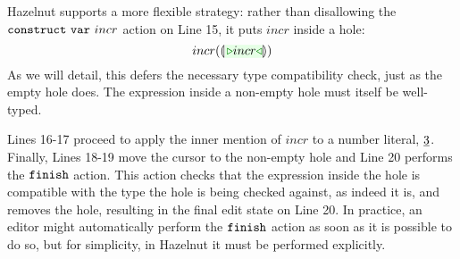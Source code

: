 Hazelnut supports a more flexible strategy: rather than disallowing the $\mathtt{construct}~\mathtt{var}~incr$ action on Line 15, it puts $incr$ inside a hole:
\[
incr(\hhole{\zwsel{incr}})
\]
As we will detail, this defers the necessary type compatibility check, just as the empty hole does. The expression inside a non-empty hole must itself be well-typed. 

Lines 16-17 proceed to apply the inner mention of $incr$ to a number literal, $\underline{3}$. Finally, Lines 18-19 move the cursor to the non-empty hole and Line 20 performs the $\mathtt{finish}$ action. This action checks that the expression inside the hole is compatible with the type the hole is being checked against, as indeed it is, and removes the hole, resulting in the final edit state on Line 20. In practice, an editor might automatically perform the $\mathtt{finish}$ action as soon as it is possible to do so, but for simplicity, in Hazelnut it must be performed explicitly.




